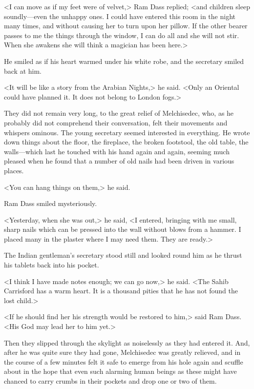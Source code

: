 <I can move as if my feet were of velvet,> Ram Dass replied; <and children sleep soundly—even the unhappy ones. I could have entered this room in the night many times, and without causing her to turn upon her pillow. If the other bearer passes to me the things through the window, I can do all and she will not stir. When she awakens she will think a magician has been here.>

He smiled as if his heart warmed under his white robe, and the secretary smiled back at him.

<It will be like a story from the Arabian Nights,> he said. <Only an Oriental could have planned it. It does not belong to London fogs.>

They did not remain very long, to the great relief of Melchisedec, who, as he probably did not comprehend their conversation, felt their movements and whispers ominous. The young secretary seemed interested in everything. He wrote down things about the floor, the fireplace, the broken footstool, the old table, the walls—which last he touched with his hand again and again, seeming much pleased when he found that a number of old nails had been driven in various places.

<You can hang things on them,> he said.

Ram Dass smiled mysteriously.

<Yesterday, when she was out,> he said, <I entered, bringing with me small, sharp nails which can be pressed into the wall without blows from a hammer. I placed many in the plaster where I may need them. They are ready.>

The Indian gentleman's secretary stood still and looked round him as he thrust his tablets back into his pocket.

<I think I have made notes enough; we can go now,> he said. <The Sahib Carrisford has a warm heart. It is a thousand pities that he has not found the lost child.>

<If he should find her his strength would be restored to him,> said Ram Dass. <His God may lead her to him yet.>

Then they slipped through the skylight as noiselessly as they had entered it. And, after he was quite sure they had gone, Melchisedec was greatly relieved, and in the course of a few minutes felt it safe to emerge from his hole again and scuffle about in the hope that even such alarming human beings as these might have chanced to carry crumbs in their pockets and drop one or two of them.